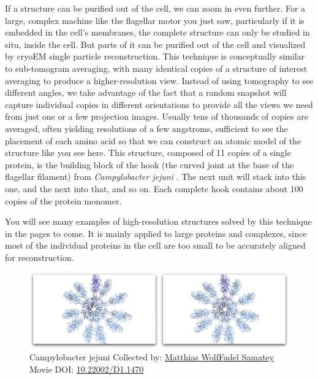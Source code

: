 \documentclass[]{tufte-book}
\begin{document}
If a structure can be purified out of the cell, we can zoom in even
further. For a large, complex machine like the flagellar motor you just
saw, particularly if it is embedded in the cell's membranes, the
complete structure can only be studied in situ, inside the cell. But
parts of it can be purified out of the cell and visualized by cryoEM
single particle reconstruction. This technique is conceptually similar
to sub-tomogram averaging, with many identical copies of a structure of
interest averaging to produce a higher-resolution view. Instead of using
tomography to see different angles, we take advantage of the fact that a
random snapshot will capture individual copies in different orientations
to provide all the views we need from just one or a few projection
images. Usually tens of thousands of copies are averaged, often yielding
resolutions of a few angstroms, sufficient to see the placement of each
amino acid so that we can construct an atomic model of the structure
like you see here. This structure, composed of 11 copies of a single
protein, is the building block of the hook (the curved joint at the base
of the flagellar filament) from \emph{Campylobacter jejuni}
\citep{matsunami2016}. The next unit will stack into this one, and the
next into that, and so on. Each complete hook contains about 100 copies
of the protein monomer.

You will see many examples of high-resolution structures solved by this
technique in the pages to come. It is mainly applied to large proteins
and complexes, since most of the individual proteins in the cell are too
small to be accurately aligned for reconstruction.






\begin{figure}
\includegraphics{movie_stills/1_8} \caption[Campylobacter jejuni Collected by:
\protect\hyperlink{matthias_wolffadel_samatey}{Matthias WolfFadel
Samatey} Movie DOI:
\href{https://doi.org/10.22002/D1.1470}{10.22002/D1.1470}]{Campylobacter jejuni Collected by:
\protect\hyperlink{matthias_wolffadel_samatey}{Matthias WolfFadel
Samatey} Movie DOI:
\href{https://doi.org/10.22002/D1.1470}{10.22002/D1.1470}}\label{fig:1-8}
\end{figure}
\end{document}
